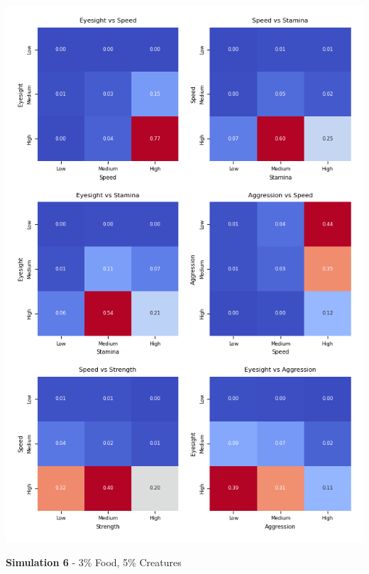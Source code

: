 \documentclass{article}
\begin{document}
\begin{center}
    \includegraphics[scale=0.9]{tests/2.5_confusion_matrices.png}
\end{center}
\textbf{Simulation 6} - 3\% Food, 5\% Creatures
\end{document}
